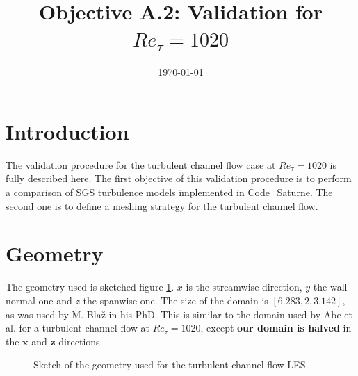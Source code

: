 \documentclass[a4paper]{article}
\title{Objective A.2: Validation for $Re_\tau = 1020$}
\date{\today}
\newcommand{\CS}{%
   {\fontfamily{ppl}\fontshape{it}\selectfont Code\_Saturne}\xspace}
\begin{document}
\maketitle


\section{Introduction}
The validation procedure for the turbulent channel flow case at $Re_\tau = 1020$ is fully described here. 
The first objective of this validation procedure is to perform a comparison of SGS turbulence models implemented in \CS.
The second one is to define a meshing strategy for the turbulent channel flow.

\section{Geometry}
The geometry used is sketched figure \ref{fig_geom}. $x$ is the streamwise direction, $y$ the wall-normal one and $z$ the spanwise one. The size of the domain is $[6.283, 2, 3.142]$, as was used by M. Bla\v{z} in his PhD. This is similar to the domain used by Abe et al. for a turbulent channel flow at $Re_\tau = 1020$, except \textbf{our domain is halved} in the $\textbf{x}$ and $\textbf{z}$ directions.

\begin{figure}[htbp]
\centering
\caption{Sketch of the geometry used for the turbulent channel flow LES.}\label{fig_geom}
\end{figure}
\end{document}
